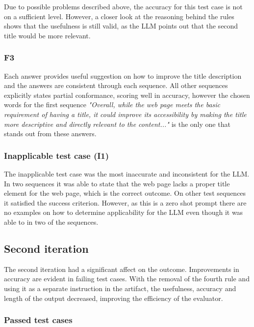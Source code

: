 Due to possible problems described above, the accuracy for this test case is not on a sufficient level. However, a closer look at the reasoning behind the rules shows that the usefulness is still valid, as the LLM points out that the second title would be more relevant.

\subsubsection{F3}

Each answer provides useful suggestion on how to improve the title description and the answers are consistent through each sequence. All other sequences explicitly states partial conformance, scoring well in accuracy, however the chosen words for the first sequence \textit{"Overall, while the web page meets the basic requirement of having a title, it could improve its accessibility by making the title more descriptive and directly relevant to the content..."} is the only one that stands out from these answers. 

\subsubsection{Inapplicable test case (I1)}

The inapplicable test case was the most inaccurate and inconsistent for the LLM. In two sequences it was able to state that the web page lacks a proper title element for the web page, which is the correct outcome. On other test sequences it satisfied the success criterion. However, as this is a zero shot prompt there are no examples on how to determine applicability for the LLM even though it was able to in two of the sequences.


\subsection{Second iteration}

The second iteration had a significant affect on the outcome. Improvements in accuracy are evident in failing test cases. With the removal of the fourth rule and using it as a separate instruction in the artifact, the usefulness, accuracy and length of the output decreased, improving the efficiency of the evaluator.

\subsubsection{Passed test cases}

